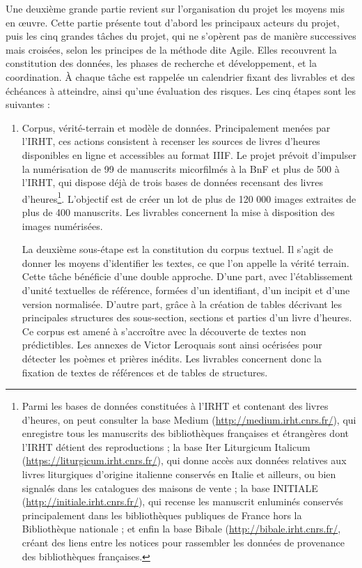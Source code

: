 \documentclass[a4paper,12pt,twoside]{book}
\begin{document}
	Une deuxième grande partie revient sur l'organisation du projet les moyens mis en œuvre. Cette partie présente tout d'abord les principaux acteurs du projet, puis les cinq grandes tâches du projet, qui ne s'opèrent pas de manière successives mais croisées, selon les principes de la méthode dite \og Agile\fg{}. Elles recouvrent la constitution des données, les phases de recherche et développement, et la coordination.  À chaque tâche est rappelée un calendrier fixant des livrables et des échéances à atteindre, ainsi qu'une évaluation des risques. Les cinq étapes sont les suivantes : 
	\begin{enumerate}
	    \item \og Corpus, vérité-terrain et modèle de données\fg{}. Principalement menées par l'IRHT, ces actions consistent à recenser les sources de livres d'heures disponibles en ligne et accessibles au format IIIF. Le projet prévoit d'impulser la numérisation de 99 de manuscrits micorfilmés à la BnF et plus de 500 à l'IRHT, qui dispose déjà de trois bases de données recensant des livres d'heures\footnote{Parmi les bases de données constituées à l'IRHT et contenant des livres d'heures, on peut consulter la base Medium (\url{http://medium.irht.cnrs.fr/}), qui enregistre tous les manuscrits des bibliothèques françaises et étrangères dont l’IRHT détient des reproductions ; la base Iter Liturgicum Italicum (\url{https://liturgicum.irht.cnrs.fr/}), qui donne accès aux données relatives aux livres liturgiques d’origine italienne conservés en Italie et ailleurs, ou bien signalés dans les catalogues des maisons de vente ; la base INITIALE (\url{http://initiale.irht.cnrs.fr/}), qui recense les manuscrit enluminés conservés principalement dans les bibliothèques publiques de France hors la Bibliothèque nationale ; et enfin la base Bibale (\url{http://bibale.irht.cnrs.fr/}, créant des liens entre les notices pour rassembler les données de provenance des bibliothèques françaises.}. L'objectif est de créer un lot de plus de 120 000 images extraites de plus de 400 manuscrits. Les livrables concernent la mise à disposition des images numérisées.
	    
	    La deuxième sous-étape est la constitution du corpus textuel. Il s'agit de donner les moyens d'identifier les textes, ce que l'on appelle la \og vérité terrain\fg{}. Cette tâche bénéficie d'une double approche. D'une part, avec l'établissement d'unité textuelles de référence, formées d'un identifiant, d'un incipit et d'une version normalisée. D'autre part, grâce à la création de tables décrivant les principales structures des sous-section, sections et parties d'un livre d'heures. Ce corpus est amené à s'accroître  avec la découverte de textes non prédictibles. Les  annexes de Victor Leroquais sont ainsi océrisées pour détecter les poèmes et prières inédits. Les livrables concernent donc la fixation de textes de références et de tables de structures. 
	    

\end{enumerate}
\end{document}
